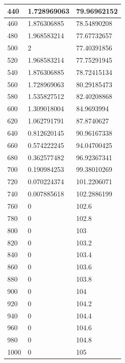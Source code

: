 \documentclass[12pt]{article}
\begin{document}
\begin{longtable}{|l|l|l|}
    440    & 1.728969063    & 79.96962152            \\ \hline
    460    & 1.876306885    & 78.54890208            \\ \hline
    480    & 1.968583214    & 77.67732657            \\ \hline
    500    & 2              & 77.40391856            \\ \hline
    520    & 1.968583214    & 77.75291945            \\ \hline
    540    & 1.876306885    & 78.72415134            \\ \hline
    560    & 1.728969063    & 80.29185473            \\ \hline
    580    & 1.535827512    & 82.40208868            \\ \hline
    600    & 1.309018004    & 84.9693994             \\ \hline
    620    & 1.062791791    & 87.8740627             \\ \hline
    640    & 0.812620145    & 90.96167338            \\ \hline
    660    & 0.574222245    & 94.04700425            \\ \hline
    680    & 0.362577482    & 96.92367341            \\ \hline
    700    & 0.190984253    & 99.38010269            \\ \hline
    720    & 0.070224374    & 101.2206071            \\ \hline
    740    & 0.007885618    & 102.2886199            \\ \hline
    760    & 0              & 102.6                  \\ \hline
    780    & 0              & 102.8                  \\ \hline
    800    & 0              & 103                    \\ \hline
    820    & 0              & 103.2                  \\ \hline
    840    & 0              & 103.4                  \\ \hline
    860    & 0              & 103.6                  \\ \hline
    880    & 0              & 103.8                  \\ \hline
    900    & 0              & 104                    \\ \hline
    920    & 0              & 104.2                  \\ \hline
    940    & 0              & 104.4                  \\ \hline
    960    & 0              & 104.6                  \\ \hline
    980    & 0              & 104.8                  \\ \hline
    1000   & 0              & 105                    \\ \hline
    \end{longtable}
\end{document}
